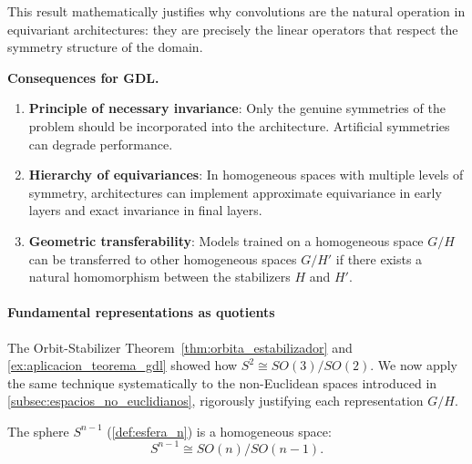 This result mathematically justifies why convolutions are the natural operation in equivariant architectures: they are precisely the linear operators that respect the symmetry structure of the domain.

\textbf{Consequences for \gls{GDL}.}
\begin{enumerate}
    \item \textbf{Principle of necessary invariance}: Only the genuine symmetries of the problem should be incorporated into the architecture. Artificial symmetries can degrade performance.

    \item \textbf{Hierarchy of equivariances}: In homogeneous spaces with multiple levels of symmetry, architectures can implement approximate equivariance in early layers and exact invariance in final layers.

    \item \textbf{Geometric transferability}: Models trained on a homogeneous space $G/H$ can be transferred to other homogeneous spaces $G/H'$ if there exists a natural homomorphism between the stabilizers $H$ and $H'$.
\end{enumerate}

\paragraph{Fundamental representations as quotients}

The Orbit-Stabilizer Theorem~\ref{thm:orbita_estabilizador} and \autoref{ex:aplicacion_teorema_gdl} showed how $S^2 \cong SO(3)/SO(2)$. We now apply the same technique systematically to the non-Euclidean spaces introduced in \autoref{subsec:espacios_no_euclidianos}, rigorously justifying each representation $G/H$.

\begin{proposition}\label{prop:esfera_cociente}
The sphere $S^{n-1}$ (\autoref{def:esfera_n}) is a homogeneous space:
\[
S^{n-1} \cong SO(n)/SO(n-1).
\]
\end{proposition}

